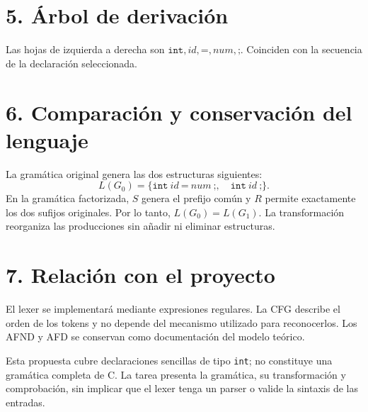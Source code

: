 \documentclass[11pt,letterpaper]{article}
\newcommand{\tok}[1]{\texttt{#1}}
\begin{document}
\newpage
\section*{5. Árbol de derivación}
\begin{center}\end{center}
Las hojas de izquierda a derecha son $\texttt{int},id,\texttt{=},num,\texttt{;}$. Coinciden con la secuencia de la declaración seleccionada.

\section*{6. Comparación y conservación del lenguaje}
La gramática original genera las dos estructuras siguientes:
\[L(G_0)=\{\texttt{int}\ id\ \texttt{=}\ num\ \texttt{;},\quad\texttt{int}\ id\ \texttt{;}\}.\]
En la gramática factorizada, $S$ genera el prefijo común y $R$ permite exactamente los dos sufijos originales. Por lo tanto, $L(G_0)=L(G_1)$. La transformación reorganiza las producciones sin añadir ni eliminar estructuras.

\section*{7. Relación con el proyecto}
El lexer se implementará mediante expresiones regulares. La CFG describe el orden de los tokens y no depende del mecanismo utilizado para reconocerlos. Los AFND y AFD se conservan como documentación del modelo teórico.

Esta propuesta cubre declaraciones sencillas de tipo \tok{int}; no constituye una gramática completa de C. La tarea presenta la gramática, su transformación y comprobación, sin implicar que el lexer tenga un parser o valide la sintaxis de las entradas.
\end{document}
